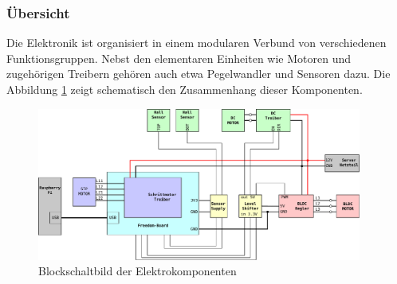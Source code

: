 \subsubsection{Übersicht}
Die Elektronik ist organisiert in einem modularen Verbund von verschiedenen
Funktionsgruppen. Nebst den elementaren Einheiten wie Motoren und zugehörigen
Treibern gehören auch etwa Pegelwandler und Sensoren dazu. Die Abbildung
\ref{fig:et-block} zeigt schematisch den Zusammenhang dieser Komponenten.


\begin{figure}[h!]
	\centering
	\includegraphics[width=0.95\textwidth]{../../fig/blockdiagram.pdf}
	\caption{Blockschaltbild der Elektrokomponenten}
	\label{fig:et-block}
\end{figure}
